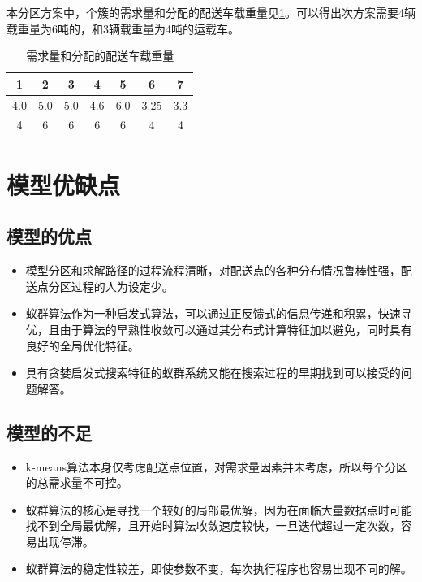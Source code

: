 \documentclass{cumcmthesis}
\begin{document}
    本分区方案中，个簇的需求量和分配的配送车载重量见\cref{tab:002}。可以得出次方案需要4辆载重量为6吨的，和3辆载重量为4吨的运载车。
    \begin{table}[!htbp]
        \caption{需求量和分配的配送车载重量}\label{tab:002} \centering
        \begin{tabular}{ccccccc}
            \toprule[1.5pt]
            1 & 2 & 3 & 4 & 5 & 6 & 7\\
            \midrule[1pt]
            4.0 & 5.0 & 5.0 & 4.6 & 6.0 & 3.25 & 3.3 \\
            4 & 6 & 6 & 6 & 6 & 4 & 4 \\
            \bottomrule[1.5pt]
        \end{tabular}
    \end{table}

\newpage

\section{模型优缺点}
    \subsection{模型的优点}
    \begin{itemize}
        \item 模型分区和求解路径的过程流程清晰，对配送点的各种分布情况鲁棒性强，配送点分区过程的人为设定少。
        \item 蚁群算法作为一种启发式算法，可以通过正反馈式的信息传递和积累，快速寻优，且由于算法的早熟性收敛可以通过其分布式计算特征加以避免，同时具有良好的全局优化特征。
        \item 具有贪婪启发式搜索特征的蚁群系统又能在搜索过程的早期找到可以接受的问题解答。
    \end{itemize}

    \subsection{模型的不足}
    \begin{itemize}
        \item k-means算法本身仅考虑配送点位置，对需求量因素并未考虑，所以每个分区的总需求量不可控。
        \item 蚁群算法的核心是寻找一个较好的局部最优解，因为在面临大量数据点时可能找不到全局最优解，且开始时算法收敛速度较快，一旦迭代超过一定次数，容易出现停滞。
        \item 蚁群算法的稳定性较差，即使参数不变，每次执行程序也容易出现不同的解。
    \end{itemize}
\end{document}
